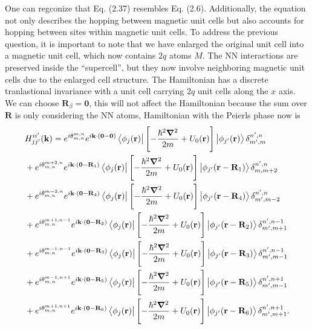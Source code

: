 \documentclass{report}
\newcommand{\f}[2]{\dfrac{#1}{#2}}
\begin{document}
One can regconize that Eq. (2.37) resembles Eq. (2.6). Additionally, the equation not only describes the hopping between magnetic unit cells but also accounts for hopping between sites within magnetic unit cells. To address the previous question, it is important to note that we have enlarged the original unit cell into a magnetic unit cell, which now contains $2q$ atoms $M$. The \ac{NN} interactions are preserved inside the ``supercell'', but they now involve neighboring magnetic unit cells due to the enlarged cell structure. The Hamiltonian has a discrete tranlastional invariance with a unit cell carrying $2q$ unit cells along the $x$ axis. \\
We can choose $\mathbf{R}_{\beta} = \mathbf{0}$, this will not affect the Hamiltonian because the sum over $\mathbf{R}$ is only considering the \ac{NN} atoms, Hamiltonian with the Peierls phase now is
\begin{equation}
	\begin{aligned}
		& H_{jj'}^{ii'}(\mathbf{k})
		= e^{i\theta_{m,n}^{m,n}}e^{i\mathbf{k} \cdot (\mathbf{0} - \mathbf{0})} \bra{\phi_{j}(\mathbf{r})} \left[-\f{\hbar^{2} \boldsymbol{\nabla}^{2}}{2m} + U_{0}(\mathbf{r})\right] \ket{\phi_{j'}(\mathbf{r})}\delta_{m',m}^{n',n}                               \\
		& + e^{i\theta_{m,n}^{m+2,n}}e^{i\mathbf{k} \cdot (\mathbf{0} - \mathbf{R}_{1})} \bra{\phi_{j}(\mathbf{r})} \left[-\f{\hbar^{2} \boldsymbol{\nabla}^{2}}{2m} + U_{0}(\mathbf{r})\right] \ket{\phi_{j'}(\mathbf{r}-\mathbf{R}_{1})}\delta_{m,m+2}^{n',n}     \\
		& + e^{i\theta_{m,n}^{m-2,n}}e^{i\mathbf{k} \cdot (\mathbf{0} - \mathbf{R}_{4})} \bra{\phi_{j}(\mathbf{r})} \left[-\f{\hbar^{2} \boldsymbol{\nabla}^{2}}{2m} + U_{0}(\mathbf{r})\right] \ket{\phi_{j'}(\mathbf{r}-\mathbf{R}_{4})}\delta_{m',m-2}^{n',n}     \\
		& + e^{i\theta_{m,n}^{m+1,n-1}}e^{i\mathbf{k} \cdot (\mathbf{0} - \mathbf{R}_{2})} \bra{\phi_{j}(\mathbf{r})} \left[-\f{\hbar^{2} \boldsymbol{\nabla}^{2}}{2m} + U_{0}(\mathbf{r})\right] \ket{\phi_{j'}(\mathbf{r}-\mathbf{R}_{2})}\delta_{m',m+1}^{n',n-1} \\
		& + e^{i\theta_{m,n}^{m-1,n-1}}e^{i\mathbf{k} \cdot (\mathbf{0} - \mathbf{R}_{3})} \bra{\phi_{j}(\mathbf{r})} \left[-\f{\hbar^{2} \boldsymbol{\nabla}^{2}}{2m} + U_{0}(\mathbf{r})\right] \ket{\phi_{j'}(\mathbf{r}-\mathbf{R}_{3})}\delta_{m',m-1}^{n',n-1} \\
		& + e^{i\theta_{m,n}^{m-1,n+1}}e^{i\mathbf{k} \cdot (\mathbf{0} - \mathbf{R}_{5})} \bra{\phi_{j}(\mathbf{r})} \left[-\f{\hbar^{2} \boldsymbol{\nabla}^{2}}{2m} + U_{0}(\mathbf{r})\right] \ket{\phi_{j'}(\mathbf{r}-\mathbf{R}_{5})}\delta_{m',m-1}^{n',n+1} \\
		& + e^{i\theta_{m,n}^{m+1,n+1}}e^{i\mathbf{k} \cdot (\mathbf{0} - \mathbf{R}_{6})} \bra{\phi_{j}(\mathbf{r})} \left[-\f{\hbar^{2} \boldsymbol{\nabla}^{2}}{2m} + U_{0}(\mathbf{r})\right] \ket{\phi_{j'}(\mathbf{r}-\mathbf{R}_{6})}\delta_{m',m+1}^{n',n+1}. \\
	\end{aligned}
\end{equation}
\end{document}
